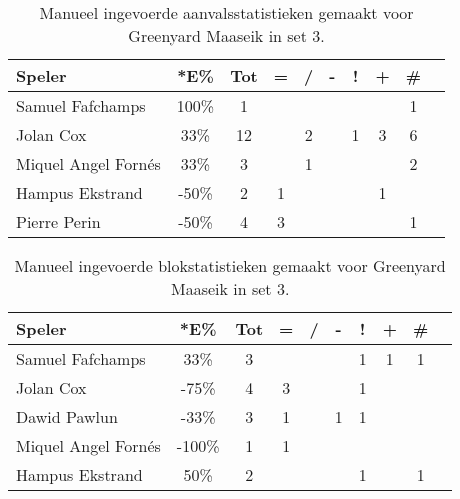 \begin{table}[ht!]
    \centering
    \scriptsize
    \begin{tabular}{|l|c|c|c|c|c|c|c|c|c|} \hline
        \textbf{Speler} & *E\% & Tot & = & / & - & ! & + & \#\\ \hline
        Samuel Fafchamps & 100\% & 1 &  &  &  &  &  & 1 \\ 
        Jolan Cox & 33\% & 12 &  & 2 &  & 1 & 3 & 6 \\ 
        Miquel Angel Fornés & 33\% & 3 &  & 1 &  &  &  & 2 \\ 
        Hampus Ekstrand & -50\% & 2 & 1 &  &  &  & 1 & \\ 
        Pierre Perin & -50\% & 4 & 3 &  &  &  &  & 1 \\ \hline
    \end{tabular}
    \caption[Manueel ingevoerde aanvalsstatistieken gemaakt Greenyard Maaseik in set 3]{\label{tab:PL3AttMaaseikMan3}Manueel ingevoerde aanvalsstatistieken gemaakt voor Greenyard Maaseik in set 3.}
\end{table}

\begin{table}[ht!]
    \centering
    \scriptsize
    \begin{tabular}{|l|c|c|c|c|c|c|c|c|c|} \hline
        \textbf{Speler} & *E\% & Tot & = & / & - & ! & + & \#\\ \hline
        Samuel Fafchamps & 33\% & 3 &  &  &  & 1 & 1 & 1 \\ 
        Jolan Cox & -75\% & 4 & 3 &  &  & 1 &  & \\ 
        Dawid Pawlun & -33\% & 3 & 1 &  & 1 & 1 &  &  \\ 
        Miquel Angel Fornés & -100\% & 1 & 1 &  &  &  &  & \\ 
        Hampus Ekstrand & 50\% & 2 &  &  &  & 1 &  & 1 \\  \hline
    \end{tabular}
    \caption[Manueel ingevoerde blokstatistieken gemaakt Greenyard Maaseik in set 3]{\label{tab:PL3BlockMaaseikMan3}Manueel ingevoerde blokstatistieken gemaakt voor Greenyard Maaseik in set 3.}
\end{table}

